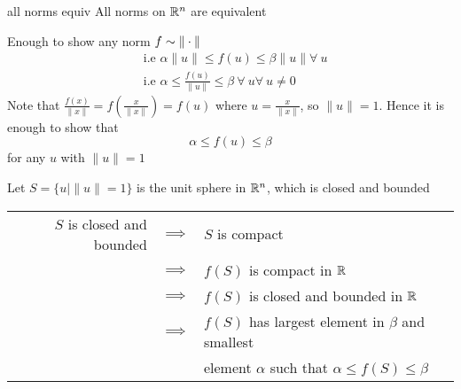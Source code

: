 \begin{Theorem}{}{all norms equiv}
	All norms on $\mathbb{R}^n$ are equivalent	
\end{Theorem}
\begin{myproof}
	Enough to show any norm $f \sim \|\cdot\|$  \begin{align*}
		& \text{i.e }\alpha \|u\|\leq f(u)\leq \beta\|u\| \forall\ u                        \\
		& \text{i.e } \alpha \leq \frac{f(u)}{\|u\|}\leq \beta\ \forall\ u \forall\ u\neq 0
	\end{align*}
	Note that $\frac{f(x)}{\|x\|}=f\left(\frac{x}{\|x\|}\right)=f(u)$ where $u=\frac{x}{\|x\|}$, so $\|u\|=1$. Hence it is enough to show that $$\alpha\leq f(u)\leq \beta$$for any $u$ with $\|u\|=1$
	
	Let $S=\{u\mid \|u\|=1\}$ is the unit sphere in $\mathbb{R}^n$, which is closed and bounded
	
	\begin{center}
		\begin{tabular}{rcl}
			$S$ is closed and bounded & $\implies$ & $S$ is compact                                        \\
			& $\implies$ & $f(S)$ is compact in $\mathbb{R}$                           \\
			& $\implies$ & $f(S)$ is closed and bounded in $\mathbb{R}$                \\
			& $\implies$ & $f(S)$ has largest element in $\beta$ and smallest    \\
			&            & element $\alpha$ such that $\alpha\leq f(S)\leq\beta$
		\end{tabular}
	\end{center}
\end{myproof}


